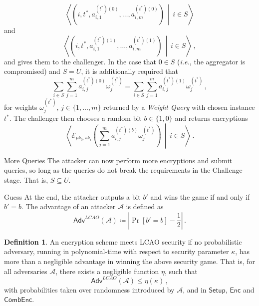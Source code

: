 \documentclass[10pt,letterpaper,oneside,twocolumn,journal]{IEEEtran}
\theoremstyle{definition}
\newtheorem{definition}{Definition}[section]
\theoremstyle{definition}
\theoremstyle{remark}
\begin{document}
\begin{LaTeXdescription}
    \begin{equation*}
        \left\langle\left(i,t^*,a^{(t^*)(0)}_{i,1},\dots,a^{(t^*)(0)}_{i,m}\right)\,\middle|\,i \in S\right\rangle
    \end{equation*}
    and
    \begin{equation*}
        \left\langle\left(i,t^*,a^{(t^*)(1)}_{i,1},\dots,a^{(t^*)(1)}_{i,m}\right)\,\middle|\, i \in S\right\rangle\,,
    \end{equation*}
    and gives them to the challenger. In the case that $0 \in S$ (\textit{i.e.}, the aggregator is compromised) and $S = U$, it is additionally required that
    \begin{equation*}
        \sum_{i\in S}\sum^{m}_{j=1} a^{(t^*)(0)}_{i,j}\omega^{(t^*)}_j = \sum_{i \in S}\sum^{m}_{j=1} a^{(t^*)(1)}_{i,j}\omega^{(t^*)}_j\,,
    \end{equation*}
    for weights $\omega^{(t^*)}_j,\,j\in\{1,\dots,m\}$ returned by a \textit{Weight Query} with chosen instance $t^*$. The challenger then chooses a random bit $b \in \{1,0\}$ and returns encryptions 
    \begin{equation*}
        \left\langle\mathcal{E}_{pk_0,sk_i}\left(\sum^m_{j=1}a^{(t^*)(b)}_{i,j}\omega^{(t^*)}_j\right)\,\middle|\,i\in S\right\rangle\,.
    \end{equation*}
    \item[More Queries] The attacker can now perform more encryptions and submit queries, so long as the queries do not break the requirements in the Challenge stage. That is, $S \subseteq U$.
    \item[Guess] At the end, the attacker outputs a bit $b'$ and wins the game if and only if $b' = b$. The advantage of an attacker $\mathcal{A}$ is defined as
    \begin{equation*}
        \mathsf{Adv}^{LCAO}(\mathcal{A}) \coloneqq \left\lvert \Pr [b'=b] - \frac{1}{2}\right\rvert\,.
    \end{equation*} 
\end{LaTeXdescription}

\begin{definition}
    An encryption scheme meets LCAO security if no probabilistic adversary, running in polynomial-time with respect to security parameter $\kappa$, has more than a negligible advantage in winning the above security game. That is, for all adversaries $\mathcal{A}$, there exists a negligible function $\eta$, such that
    \begin{equation*}
        \mathsf{Adv}^{LCAO}(\mathcal{A}) \leq \eta(\kappa)\,,
    \end{equation*}
    with probabilities taken over randomness introduced by $\mathcal{A}$, and in $\mathsf{Setup}$, $\mathsf{Enc}$ and $\mathsf{CombEnc}$.
\end{definition}
\end{document}
